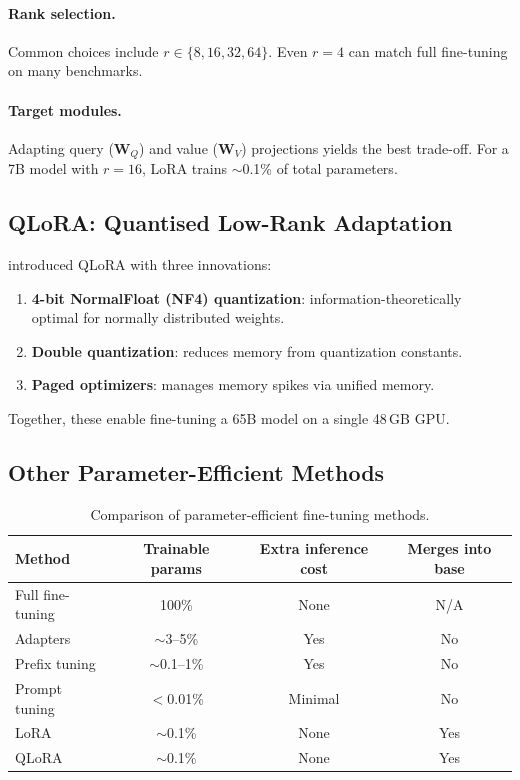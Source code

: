\documentclass[12pt,a4paper]{report}
\theoremstyle{definition}
\begin{document}
\paragraph{Rank selection.} Common choices include $r \in \{8, 16, 32, 64\}$. Even $r = 4$ can match full fine-tuning on many benchmarks.

\paragraph{Target modules.} Adapting query ($\mathbf{W}_Q$) and value ($\mathbf{W}_V$) projections yields the best trade-off. For a 7B model with $r = 16$, LoRA trains $\sim$0.1\% of total parameters.

\subsection{QLoRA: Quantised Low-Rank Adaptation}
\label{sec:qlora}

\citet{dettmers2023qlora} introduced QLoRA with three innovations:
\begin{enumerate}[leftmargin=1.8em,itemsep=2pt]
\item \textbf{4-bit NormalFloat (NF4) quantization}: information-theoretically optimal for normally distributed weights.
\item \textbf{Double quantization}: reduces memory from quantization constants.
\item \textbf{Paged optimizers}: manages memory spikes via unified memory.
\end{enumerate}
Together, these enable fine-tuning a 65B model on a single 48\,GB GPU.

\subsection{Other Parameter-Efficient Methods}

\begin{table}[t]
  \centering
  \caption{Comparison of parameter-efficient fine-tuning methods.}
  \label{tab:peft-comparison}
  \begin{tabular}{@{}lccc@{}}
    \toprule
    \textbf{Method} & \textbf{Trainable params} & \textbf{Extra inference cost}
      & \textbf{Merges into base} \\
    \midrule
    Full fine-tuning              & 100\%          & None       & N/A \\
    Adapters \citep{houlsby2019adapters}
                                  & $\sim$3--5\%   & Yes        & No \\
    Prefix tuning \citep{li2021prefix}
                                  & $\sim$0.1--1\% & Yes        & No \\
    Prompt tuning \citep{lester2021prompt}
                                  & $<$0.01\%      & Minimal    & No \\
    LoRA \citep{hu2021lora}       & $\sim$0.1\%    & None       & Yes \\
    QLoRA \citep{dettmers2023qlora}
                                  & $\sim$0.1\%    & None       & Yes \\
    \bottomrule
  \end{tabular}
\end{table}
\end{document}
